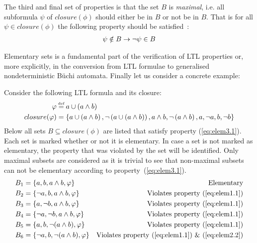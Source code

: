 The third and final set of properties is that the set $B$ is \emph{maximal}, i.e. all subformula $\psi$ of $closure(\phi)$ should either be in $B$ or not be in $B$. That is for all $\psi \in closure(\phi)$ the following property should be satisfied~\cite[Fig.~5.20]{baier2008principles}:
\begin{align}
    \psi \notin B \rightarrow \lnot \psi \in B \label{eq:elem3.1}
\end{align}

Elementary sets is a fundamental part of the verification of LTL properties or, more explicitly, in the conversion from LTL formulae to generalised nondeterministic Büchi automata. Finally let us consider a concrete example:

\begin{example}
Consider the following LTL formula and its closure:
\begin{align*}
    \phi &\eqdef a \U \left( a \land b \right) \\
    closure(\phi) &= \left\{ a \U \left( a \land b \right), \lnot \left( a \U \left( a \land b \right) \right), a \land b, \lnot \left( a \land b \right), a, \lnot a, b, \lnot b \right\}
\end{align*}
Below all sets $B \subseteq closure(\phi)$ are listed that satisfy property (\ref{eq:elem3.1}). Each set is marked whether or not it is elementary. In case a set is not marked as elementary, the property that was violated by the set will be identified. Only maximal subsets are considered as it is trivial to see that non-maximal subsets can not be elementary according to property~(\ref{eq:elem3.1}).
\begin{align*}
    B_1    &= \left\{ a,       b,       a\land b,         \phi       \right\} &\text{Elementary} \\
    B_2    &= \left\{ \lnot a, b,       a\land b,         \phi       \right\} &\text{Violates property (\ref{eq:elem1.1})} \\
    B_3    &= \left\{ a,       \lnot b, a\land b,         \phi       \right\} &\text{Violates property (\ref{eq:elem1.1})} \\
    B_4    &= \left\{ \lnot a, \lnot b, a\land b,         \phi       \right\} &\text{Violates property (\ref{eq:elem1.1})} \\
    B_5    &= \left\{ a,       b,       \lnot (a\land b), \phi       \right\} &\text{Violates property (\ref{eq:elem1.1})} \\
    B_6    &= \left\{ \lnot a, b,       \lnot (a\land b), \phi       \right\} &\text{Violates property (\ref{eq:elem1.1}) \& (\ref{eq:elem2.2})} \\

\end{align*}
\end{example}
